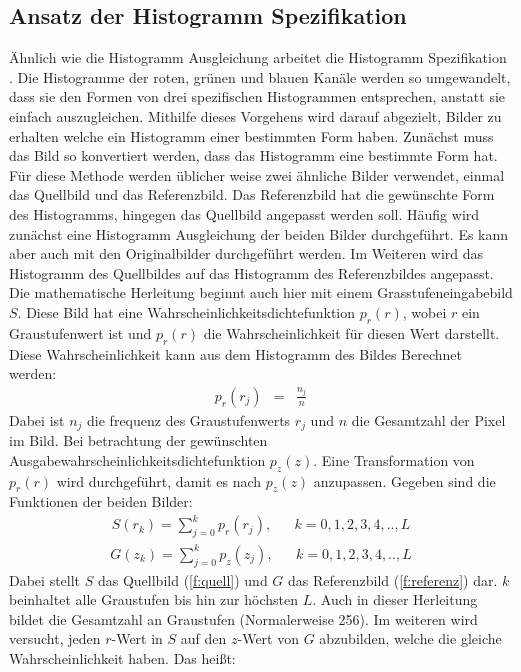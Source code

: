   \subsection{Ansatz der Histogramm Spezifikation}\label{s.hs}
Ähnlich wie die Histogramm Ausgleichung arbeitet die Histogramm Spezifikation\\ \cite{goatman2003colour}. Die Histogramme der roten, grünen und blauen Kanäle werden so umgewandelt, dass sie den Formen von drei spezifischen Histogrammen entsprechen, anstatt sie einfach auszugleichen. Mithilfe dieses Vorgehens wird darauf abgezielt, Bilder zu erhalten welche ein Histogramm einer bestimmten Form haben. Zunächst muss das Bild so konvertiert werden, dass das Histogramm eine bestimmte Form hat. Für diese Methode werden üblicher weise zwei ähnliche Bilder verwendet, einmal das Quellbild und das Referenzbild. Das Referenzbild hat die gewünschte Form des Histogramms, hingegen das Quellbild angepasst werden soll. Häufig wird zunächst eine Histogramm Ausgleichung der beiden Bilder durchgeführt. Es kann aber auch mit den Originalbilder durchgeführt werden. Im Weiteren wird das Histogramm des Quellbildes auf das Histogramm des Referenzbildes angepasst. Die mathematische Herleitung beginnt auch hier mit einem Grasstufeneingabebild $S$. 
Diese Bild hat eine Wahrscheinlichkeitsdichtefunktion $p_{r}(r)$, wobei $r$ ein Graustufenwert ist und $p_{r}(r)$ die Wahrscheinlichkeit für diesen Wert darstellt. Diese Wahrscheinlichkeit kann aus dem Histogramm des Bildes Berechnet werden:
\begin{eqnarray} p_{r}(r_{j})&=&\frac{n_{j}}{n} \end{eqnarray}
Dabei ist $n_{j}$ die frequenz des Graustufenwerts $r_{j}$ und $n$ die Gesamtzahl der Pixel im Bild. Bei betrachtung der gewünschten Ausgabewahrscheinlichkeitsdichtefunktion $p_{z}(z)$. Eine Transformation von $p_{r}(r)$ wird durchgeführt, damit es nach $p_{z}(z)$ anzupassen. Gegeben sind die Funktionen der beiden Bilder: 
\begin{align} \label{f:quell} S(r_{k})=\sum_{j=0}^k p_{r}(r_{j}) ,& &k=0,1,2,3,4,..,L\end{align}
\begin{align} \label{f:referenz} G(z_{k})=\sum_{j=0}^k p_{z}(z_{j}) ,& &k=0,1,2,3,4,.., L \end{align}
Dabei stellt $S$ das Quellbild (\ref{f:quell}) und $G$ das Referenzbild (\ref{f:referenz}) dar. $k$ beinhaltet alle Graustufen bis hin zur höchsten $L$.   
Auch in dieser Herleitung bildet die Gesamtzahl an Graustufen (Normalerweise 256). Im weiteren wird versucht, jeden $r$-Wert in $S$ auf den $z$-Wert von $G$ abzubilden, welche die gleiche Wahrscheinlichkeit haben. Das heißt:
